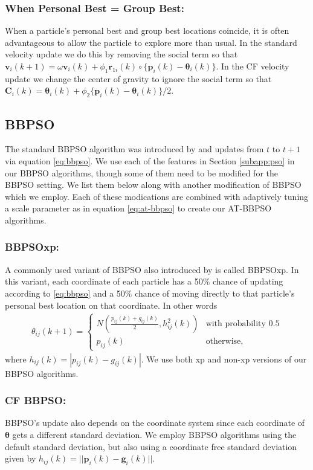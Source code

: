 \documentclass[cmbright]{staauth}
\begin{document}
\subsubsection{When Personal Best = Group Best:}
When a particle's personal best and group best locations coincide, it is often advantageous to allow the particle to explore more than usual. In the standard velocity update we do this by removing the social term so that $\bm{v}_i(k+1) = \omega \bm{v}_i(k) + \phi_1 \bm{r}_{1i}(k)\circ\{\bm{p}_i(k) - \bm{\theta}_i(k)\}$. In the CF velocity update we change the center of gravity to ignore the social term so that $\bm{C}_i(k) = \bm{\theta}_i(k) + \phi_2\{\bm{p}_i(k) - \bm{\theta}_i(k)\}/2$.

\subsection{BBPSO}\label{subapp:bbpso}
The standard BBPSO algorithm was introduced by \citet{kennedy2003bare} and updates from $t$ to $t+1$ via equation \eqref{eq:bbpso}. We use each of the features in Section \ref{subapp:pso} in our BBPSO algorithms, though some of them need to be modified for the BBPSO setting. We list them below along with another modification of BBPSO which we employ. Each of these modications are combined with adaptively tuning a scale parameter as in equation \eqref{eq:at-bbpso} to create our AT-BBPSO algorithms.

\subsubsection{BBPSOxp:}
A commonly used variant of BBPSO also introduced by \citet{kennedy2003bare} is called BBPSOxp. In this variant, each coordinate of each particle has a 50\% chance of updating according to \eqref{eq:bbpso} and a 50\% chance of moving directly to that particle's personal best location on that coordinate. In other words
\begin{align}\label{eq:bbpsoxp}
\theta_{ij}(k+1) = \begin{cases} N\left(\frac{p_{ij}(k) + g_{ij}(k)}{2}, h^2_{ij}(k)\right) & \mbox{with probability }0.5\\
p_{ij}(k) &\mbox{otherwise,}\end{cases}
\end{align}
where $h_{ij}(k) = |p_{ij}(k) - g_{ij}(k)|$. We use both xp and non-xp versions of our BBPSO algorithms.

\subsubsection{CF BBPSO:} 
BBPSO's update also depends on the coordinate system since each coordinate of $\bm{\theta}$ gets a different standard deviation. We employ BBPSO algorithms using the default standard deviation, but also using a coordinate free standard deviation given by $h_{ij}(k) = ||\bm{p}_i(k) - \bm{g}_i(k)||$. 
\end{document}
